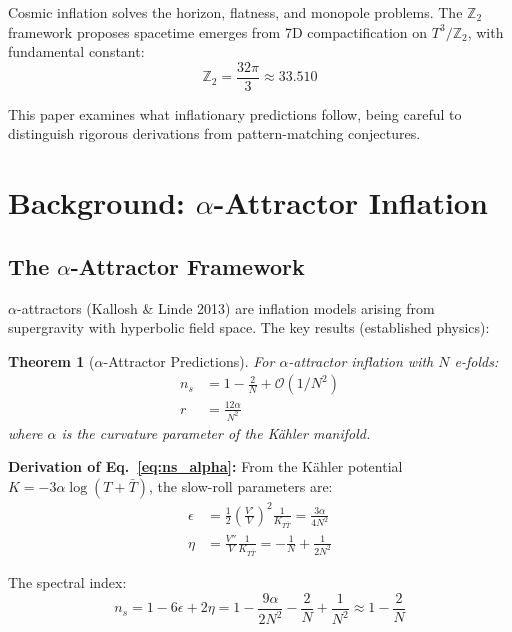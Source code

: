 \documentclass[12pt,a4paper]{article}
\newtheorem{theorem}{Theorem}
\begin{document}
Cosmic inflation solves the horizon, flatness, and monopole problems. The $\mathbb{Z}_2$ framework proposes spacetime emerges from 7D compactification on $T^3/\mathbb{Z}_2$, with fundamental constant:
\begin{equation}
\mathbb{Z}_2 = \frac{32\pi}{3} \approx 33.510
\end{equation}

This paper examines what inflationary predictions follow, being careful to distinguish rigorous derivations from pattern-matching conjectures.

\section{Background: $\alpha$-Attractor Inflation}

\subsection{The $\alpha$-Attractor Framework}

$\alpha$-attractors (Kallosh \& Linde 2013) are inflation models arising from supergravity with hyperbolic field space. The key results (established physics):

\begin{theorem}[$\alpha$-Attractor Predictions]
For $\alpha$-attractor inflation with $N$ e-folds:
\begin{align}
n_s &= 1 - \frac{2}{N} + \mathcal{O}(1/N^2) \label{eq:ns_alpha}\\
r &= \frac{12\alpha}{N^2} \label{eq:r_alpha}
\end{align}
where $\alpha$ is the curvature parameter of the K\"ahler manifold.
\end{theorem}

\textbf{Derivation of Eq.~\eqref{eq:ns_alpha}:} From the K\"ahler potential $K = -3\alpha \log(T + \bar{T})$, the slow-roll parameters are:
\begin{align}
\epsilon &= \frac{1}{2}\left(\frac{V'}{V}\right)^2 \frac{1}{K_{T\bar{T}}} = \frac{3\alpha}{4N^2} \\
\eta &= \frac{V''}{V} \frac{1}{K_{T\bar{T}}} = -\frac{1}{N} + \frac{1}{2N^2}
\end{align}

The spectral index:
\begin{equation}
n_s = 1 - 6\epsilon + 2\eta = 1 - \frac{9\alpha}{2N^2} - \frac{2}{N} + \frac{1}{N^2} \approx 1 - \frac{2}{N}
\end{equation}
\end{document}

